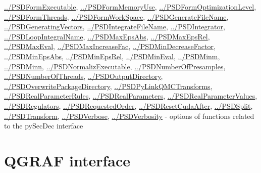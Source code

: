 \documentclass[../FeynHelpersManual.tex]{subfiles}
\begin{document}
\begin{itemize}
  \hyperlink{../psdformexecutable}{../PSDFormExecutable},
  \hyperlink{../psdformmemoryuse}{../PSDFormMemoryUse},
  \hyperlink{../psdformoptimizationlevel}{../PSDFormOptimizationLevel},
  \hyperlink{../psdformthreads}{../PSDFormThreads},
  \hyperlink{../psdformworkspace}{../PSDFormWorkSpace},
  \hyperlink{../psdgeneratefilename}{../PSDGenerateFileName},
  \hyperlink{../psdgeneratingvectors}{../PSDGeneratingVectors},
  \hyperlink{../psdintegratefilename}{../PSDIntegrateFileName},
  \hyperlink{../psdintegrator}{../PSDIntegrator},
  \hyperlink{../psdloopintegralname}{../PSDLoopIntegralName},
  \hyperlink{../psdmaxepsabs}{../PSDMaxEpsAbs},
  \hyperlink{../psdmaxepsrel}{../PSDMaxEpsRel},
  \hyperlink{../psdmaxeval}{../PSDMaxEval},
  \hyperlink{../psdmaxincreasefac}{../PSDMaxIncreaseFac},
  \hyperlink{../psdmindecreasefactor}{../PSDMinDecreaseFactor},
  \hyperlink{../psdminepsabs}{../PSDMinEpsAbs},
  \hyperlink{../psdminepsrel}{../PSDMinEpsRel},
  \hyperlink{../psdmineval}{../PSDMinEval},
  \hyperlink{../psdminm}{../PSDMinm},
  \hyperlink{../psdminn}{../PSDMinn},
  \hyperlink{../psdnormalizexecutable}{../PSDNormalizExecutable},
  \hyperlink{../psdnumberofpresamples}{../PSDNumberOfPresamples},
  \hyperlink{../psdnumberofthreads}{../PSDNumberOfThreads},
  \hyperlink{../psdoutputdirectory}{../PSDOutputDirectory},
  \hyperlink{../psdoverwritepackagedirectory}{../PSDOverwritePackageDirectory},
  \hyperlink{../psdpylinkqmctransforms}{../PSDPyLinkQMCTransforms},
  \hyperlink{../psdrealparameterrules}{../PSDRealParameterRules},
  \hyperlink{../psdrealparameters}{../PSDRealParameters},
  \hyperlink{../psdrealparametervalues}{../PSDRealParameterValues},
  \hyperlink{../psdregulators}{../PSDRegulators},
  \hyperlink{../psdrequestedorder}{../PSDRequestedOrder},
  \hyperlink{../psdresetcudaafter}{../PSDResetCudaAfter},
  \hyperlink{../psdsplit}{../PSDSplit},
  \hyperlink{../psdtransform}{../PSDTransform},
  \hyperlink{../psdverbose}{../PSDVerbose},
  \hyperlink{../psdverbosity}{../PSDVerbosity} - options of functions
  related to the pySecDec interface
\end{itemize}

\hypertarget{qgraf interface}{
\section{QGRAF interface}\label{qgraf interface}}
\end{document}
